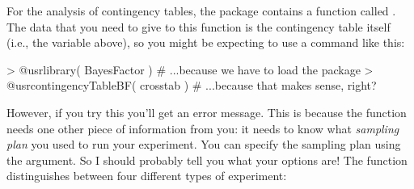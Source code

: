 For the analysis of contingency tables, the  package contains a function called . The data that you need to give to this function is the contingency table itself (i.e., the  variable above), so you might be expecting to use a command like this:
\begin{rblock1}
> @usr{library( BayesFactor )}           # ...because we have to load the package
> @usr{contingencyTableBF( crosstab )}   # ...because that makes sense, right?
\end{rblock1}
However, if you try this you'll get an error message. This is because the  function needs one other piece of information from you: it needs to know what {\it sampling plan} you used to run your experiment. You can specify the sampling plan using the  argument. So I should probably tell you what your options are! The  function distinguishes between four different types of experiment:

